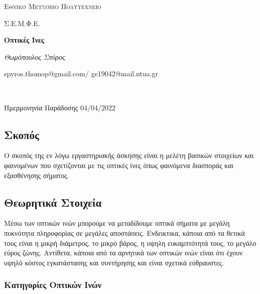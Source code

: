 \documentclass[a4paper]{article}
\begin{document}
\begin{titlepage}			%
	\centering
	{\scshape\LARGE Εθνικό Μετσόβιο Πολυτεχνείο\par}
	{\scshape \LARGE Σ.Ε.Μ.Φ.Ε.\par}
	\vspace{1cm}
	{\huge\bfseries Οπτικές Ίνες \par}
	\vspace{1cm}
	{\Large\itshape Θωμόπουλος Σπύρος\par}		%
	
	{\large spyros.thomop@gmail.com/ ge19042@mail.ntua.gr\par \hfill \\}%
	\vspace{1cm}
	{\large Ημερμονηνία Παράδοσης 04/04/2022\par}
\end{titlepage}

\subsection*{Σκοπός}
	Ο σκοπός της εν λόγω εργαστηριακής άσκησης είναι η μελέτη βασικών στοιχείων και φαινομένων που σχετίζονται με τις οπτικές ίνες όπως φαινόμενα διασποράς και εξασθένησης σήματος.
\subsection*{Θεωρητικά Στοιχεία}
	Μέσω των οπτικών ινών μπορούμε να μεταδίδουμε οπτικά σήματα με μεγάλη πυκνότητα πληροφορίας σε μεγάλες αποστάσεις. Ενδεικτικα, κάποια από τα θετικά τους είναι η μικρή διάμετρος, το μικρό βάρος, η υψηλη ευκαμπτότητά τους, το μεγάλο εύρος ζώνης. Αντίθετα, κάποια από τα αρνητικά των οπτικών ινών είναι ότι έχουν υψηλό κόστος εγκατάστασης και συντήρησης και είναι σχετικά εύθραυστες.
	\subsubsection*{Κατηγορίες Οπτικών Ινών}
\end{document}
